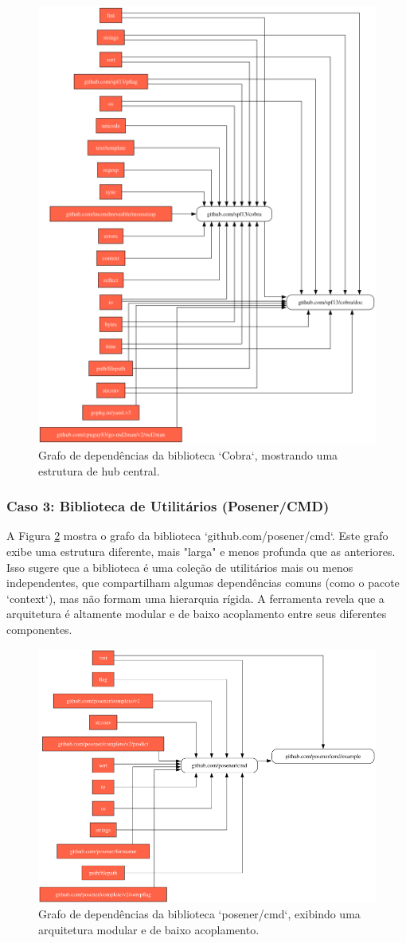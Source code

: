 \documentclass[12pt]{article}
\begin{document}
\begin{figure}[htbp]
\centering
\includegraphics[width=.6\textwidth]{examples/github.com_spf13_cobra.png}
\caption{Grafo de dependências da biblioteca `Cobra`, mostrando uma estrutura de hub central.}
\label{fig:exemplo-2}
\end{figure}

\subsubsection{Caso 3: Biblioteca de Utilitários (Posener/CMD)}
A Figura \ref{fig:exemplo-3} mostra o grafo da biblioteca `github.com/posener/cmd`. Este grafo exibe uma estrutura diferente, mais "larga" e menos profunda que as anteriores. Isso sugere que a biblioteca é uma coleção de utilitários mais ou menos independentes, que compartilham algumas dependências comuns (como o pacote `context`), mas não formam uma hierarquia rígida. A ferramenta revela que a arquitetura é altamente modular e de baixo acoplamento entre seus diferentes componentes.

\begin{figure}[htbp]
\centering
\includegraphics[width=.6\textwidth]{examples/github.com_posener_cmd.png}
\caption{Grafo de dependências da biblioteca `posener/cmd`, exibindo uma arquitetura modular e de baixo acoplamento.}
\label{fig:exemplo-3}
\end{figure}
\end{document}
